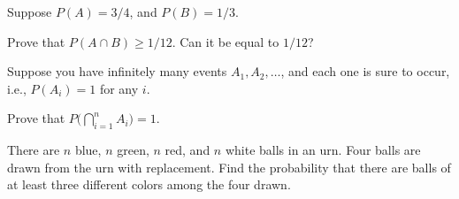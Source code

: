 \begin{problem}
  Suppose \(P(A)=3/4\), and \(P(B)=1/3\).

  Prove that \(P(A\cap B)\geq 1/12\). Can it be equal to \(1/12\)?
\end{problem}
\begin{solution}

\end{solution}
\newpage

\begin{problem}
  Suppose you have infinitely many events \(A_1,A_2,\dotsc\), and each one
  is sure to occur, i.e., \(P(A_i)=1\) for any \(i\).

  Prove that \(P\bigl(\bigcap_{i=1}^n A_i\bigr)=1\).
\end{problem}
\begin{solution}

\end{solution}
\newpage

\begin{problem}
  There are \(n\) blue, \(n\) green, \(n\) red, and \(n\) white balls in an
  urn. Four balls are drawn from the urn with replacement. Find the
  probability that there are balls of at least three different colors among
  the four drawn.
\end{problem}
\begin{solution}

\end{solution}

